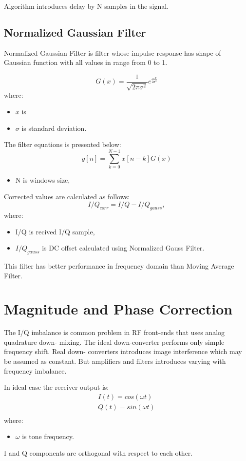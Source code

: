 \documentclass[en,printmode]{mgr}
\begin{document}
			Algorithm introduces delay by N samples in the signal. 
		\subsection*{Normalized Gaussian Filter}
			Normalized Gaussian Filter is filter whose impulse response has shape of Gaussian
			function with all values in range from 0 to 1.
			
			\[
				G(x) = \frac{1}{ \sqrt{2\pi \sigma^2}}e^{\frac{-x}{2\sigma^2}}
			\]
			where:
			\begin{itemize}
				\item $x$ is 
				\item $\sigma$ is standard deviation. 
			\end{itemize}
			
			The filter equations is presented below:
			\[
				y[n] = \sum_{k=0}^{N-1}x[n-k]G(x)
			\]
			\begin{itemize}
				\item N is windows size,
			\end{itemize}			
			Corrected values are calculated as follows:
			\[
				I/Q_{corr} = I/Q - I/Q_{gauss},
			\]
						where:
			\begin{itemize}
				\item I/Q is recived I/Q sample,
				\item $I/Q_{gauss}$ is DC offset calculated using Normalized Gauss Filter.
			\end{itemize}
			This filter has better performance in frequency domain than Moving Average Filter.
	\section{Magnitude and Phase Correction}
		The I/Q imbalance is common problem in RF front-ends that uses analog quadrature down-
		mixing. The ideal down-converter performs only simple frequency shift. Real down-
	    converters introduces image interference which may be assumed as constant. But amplifiers
	    and filters introduces varying with frequency imbalance.
	    
	    In ideal case the receiver output is:
		\begin{equation}
			\renewcommand*{\arraystretch}{1.3} 
			\begin{array}{ll}
				I(t) = cos(\omega t) \\
				Q(t) = sin(\omega t) \\
			\end{array}
		\end{equation}
		where:
		\begin{itemize}
			\item $\omega$ is tone frequency.
		\end{itemize}
	    I and Q components are orthogonal with respect to each other.
	    
\end{document}
